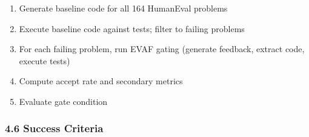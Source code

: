 \begin{enumerate}
\item Generate baseline code for all 164 HumanEval problems
\item Execute baseline code against tests; filter to failing problems
\item For each failing problem, run EVAF gating (generate feedback, extract code, execute tests)
\item Compute accept rate and secondary metrics
\item Evaluate gate condition
\end{enumerate}

\subsubsection{4.6 Success Criteria}

\begin{table}[htbp]
\centering
{}
\end{table}
